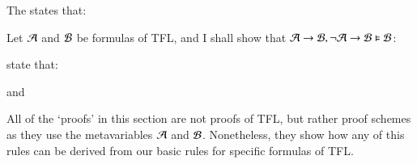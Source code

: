 \documentclass[12pt, a4paper, twoside, openright, titlepage]{book}
\begin{document}
\begin{defn}{}{}
    The  states that: \begin{fitchproof}
        \open
        \close
        \open 
        \close
         
    \end{fitchproof}
\end{defn}
\begin{proof*}{}{}
    Let $\mathcal{A}$ and $\mathcal{B}$ be formulas of TFL, and I shall show that $\mathcal{A}\rightarrow\mathcal{B},\neg\mathcal{A}\rightarrow\mathcal{B}\vDash \mathcal{B}$:
    \begin{fitchproof}
        \open
             
             
             
        \close
         
    \end{fitchproof}
\end{proof*}


\begin{defn}{}{}
     state that: \begin{fitchproof}
         
    \end{fitchproof}
    \begin{fitchproof}
         
    \end{fitchproof}
     \begin{fitchproof}
          
    \end{fitchproof}
    and
    \begin{fitchproof}
         
    \end{fitchproof}
\end{defn}


\begin{rmk}{}{}
    All of the `proofs' in this section are not proofs of TFL, but rather proof schemes as they use the metavariables $\mathcal{A}$ and $\mathcal{B}$. Nonetheless, they show how any of this rules can be derived from our basic rules for specific formulas of TFL.
\end{rmk}
\end{document}

